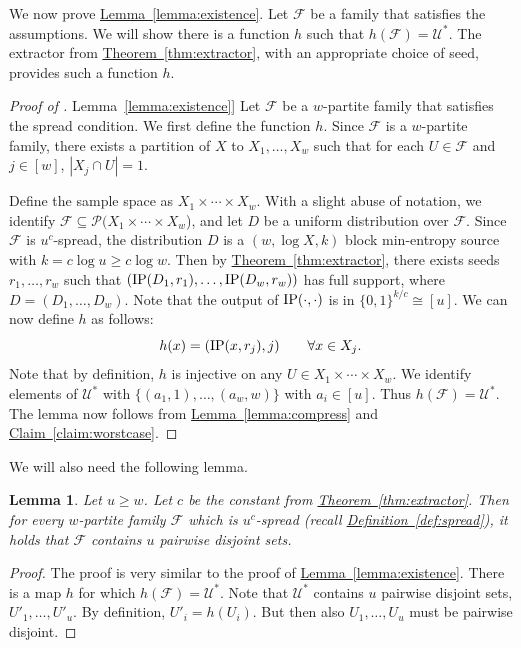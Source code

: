 \documentclass[11pt]{article}
\numberwithin{equation}{section}
\newtheorem{lemma}[theorem]{Lemma}
\theoremstyle{definition}
\theoremstyle{plain}
\newcommand{\expref}[2]{\hyperref[#2]{#1~\ref{#2}}}
\newcommand{\IP}{\textnormal{IP}}
\newcommand{\calF}{\mathcal{F}} %
\begin{document}
We now prove \expref{Lemma}{lemma:existence}. Let $\calF$ be a family
%
that satisfies the assumptions.
We will show there is a function $h$ such that $h(\calF) = \mathcal{U}^*$.
The extractor from
\expref{Theorem}{thm:extractor}, %
with an appropriate choice of seed, provides such a function $h$.

\begin{proof}[Proof of \expref{Lemma}{lemma:existence}]
Let $\calF$ be a %
$w$-partite  %
family
%
that satisfies the spread condition.
We first define the function $h$. Since $\calF$ is a
%
$w$-partite family,  %
there exists a partition of $X$ to $X_1,\dots,X_{w}$
such that for each $U\in\calF$ and $j\in[w]$, $|X_{j}\cap U| = 1$.

Define the sample space as $X_{1}\times\cdots\times X_{w}$. With a slight abuse of %
notation,  %
we identify $\calF\subseteq \mathcal{P}(X_{1}\times\cdots\times X_{w}$), and let $D$ be a uniform distribution over $\calF$.
Since $\calF$ is $u^{c}$-spread, the distribution $D$ is a $(w, \log X, k)$ block min-entropy source with $k = c \log u \ge c \log w$.
Then by \expref{Theorem}{thm:extractor}, there exists seeds $r_1,\dots,r_w$ such that $(\IP(D_1, r_{1}),\dots,\IP(D_{w},r_{w}))$ has full support,
where $D=(D_1,\ldots,D_w)$. Note that the output of $\IP(\cdot,\cdot)$ is in $\{0,1\}^{k/c} \cong [u]$.
We can now define $h$ as follows:
$$
h(x) = (\IP(x, r_{j}), j) \qquad \forall x \in X_j.
$$
Note that by definition, $h$ is injective on any $U \in X_1 \times \cdots \times X_w$. We identify elements of $\mathcal{U}^*$ with
$\{(a_1,1),\ldots,(a_w,w)\}$ with $a_i \in [u]$. Thus $h(\calF) = \mathcal{U}^*$. The lemma now follows
from \expref{Lemma}{lemma:compress} and \expref{Claim}{claim:worstcase}.
\end{proof}

We will also need the following lemma.
\begin{lemma}
\label{lemma:disjoint}
Let $u \ge w$. Let $c$ be the constant from \expref{Theorem}{thm:extractor}.
Then for every %
$w$-partite family  %
$\calF$ which is $u^c$-spread (recall \expref{Definition}{def:spread}),
it holds that $\calF$ contains $u$ pairwise disjoint sets.
\end{lemma}

\begin{proof}
The proof is very similar to the proof of \expref{Lemma}{lemma:existence}.
There is a map $h$ for which $h(\calF) = \mathcal{U}^*$.
Note that $\mathcal{U}^*$ contains $u$ pairwise disjoint sets,
$U'_1,\ldots,U'_u$. By definition, $U'_i = h(U_i)$. But then
also $U_1,\ldots,U_u$ must be pairwise disjoint.
\end{proof}
\end{document}
